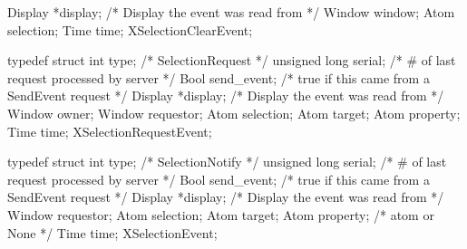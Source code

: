 \documentclass{report}
\begin{document}
\begin{itemize}
\begin{cppcode}
{                    Display *display;           /* Display the event was read from */
                    Window window;
                    Atom selection;
                    Time time;
                } XSelectionClearEvent; 
            \end{cppcode}
            \begin{cppcode}
                typedef struct {
                    int type;                   /* SelectionRequest */
                    unsigned long serial;       /* # of last request processed by server */
                    Bool send_event;            /* true if this came from a SendEvent request */
                    Display *display;           /* Display the event was read from */
                    Window owner;
                    Window requestor;
                    Atom selection;
                    Atom target;
                    Atom property;
                    Time time;
                } XSelectionRequestEvent;
            \end{cppcode}
            \begin{cppcode}
                typedef struct {
                    int type;               /* SelectionNotify */
                    unsigned long serial;   /* # of last request processed by server */
                    Bool send_event;        /* true if this came from a SendEvent request */
                    Display *display;       /* Display the event was read from */
                    Window requestor;
                    Atom selection;
                    Atom target;
                    Atom property;          /* atom or None */
                    Time time;
                } XSelectionEvent;
            \end{cppcode}

    \end{itemize}
\end{document}
